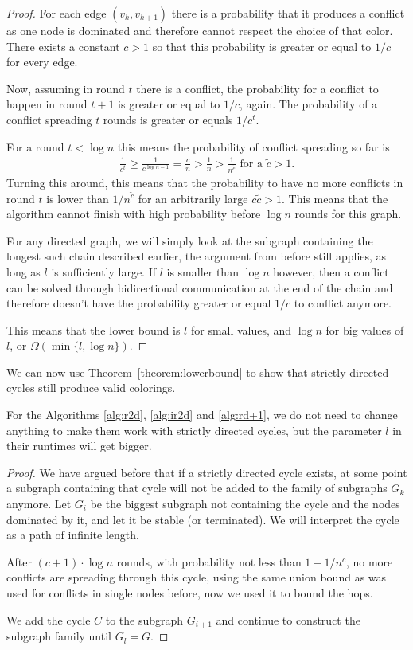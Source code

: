 \begin{proof}
For each edge $(v_k, v_{k+1})$ there is a probability that it produces a conflict as one node is dominated and therefore cannot respect the choice of that color. There exists a constant $c>1$ so that this probability is greater or equal to $1/c$ for every edge.

Now, assuming in round $t$ there is a conflict, the probability for a conflict to happen in round $t+1$ is greater or equal to $1/c$, again. The probability of a conflict spreading $t$ rounds is greater or equals $1/c^t$.

For a round $t < \log n$ this means the probability of conflict spreading so far is 
\begin{align*}
\frac{1}{c^t} \geq \frac{1}{c^{\log n-1}} = \frac{c}{n} > \frac{1}{n} > \frac{1}{n^{\tilde{c}}} \text{ for a } \tilde{c} > 1.
\end{align*}
Turning this around, this means that the probability to have no more conflicts in round $t$ is lower than $1/n^{\tilde{c}}$ for an arbitrarily large $c\tilde{c} > 1$. This means that the algorithm cannot finish with high probability before $\log n$ rounds for this graph.

For any directed graph, we will simply look at the subgraph containing the longest such chain described earlier, the argument from before still applies, as long as $l$ is sufficiently large. If $l$ is smaller than $\log n$ however, then a conflict can be solved through bidirectional communication at the end of the chain and therefore doesn't have the probability greater or equal $1/c$ to conflict anymore.

This means that the lower bound is $l$ for small values, and $\log n$ for big values of $l$, or $\Omega (\min\{l, \log n\})$.
\end{proof}

We can now use Theorem~\ref{theorem:lowerbound} to show that strictly directed cycles still produce valid colorings.

\begin{lemma}
For the Algorithms \ref{alg:r2d}, \ref{alg:ir2d} and \ref{alg:rd+1}, we do not need to change anything to make them work with strictly directed cycles, but the parameter $l$ in their runtimes will get bigger.
\end{lemma}
\begin{proof}
We have argued before that if a strictly directed cycle exists, at some point a subgraph containing that cycle will not be added to the family of subgraphs $G_k$ anymore. Let $G_i$ be the biggest subgraph not containing the cycle and the nodes dominated by it, and let it be stable (or terminated). We will interpret the cycle as a path of infinite length.

After $(c+1) \cdot \log n$ rounds, with probability not less than $1 - 1/n^c$, no more conflicts are spreading through this cycle, using the same union bound as was used for conflicts in single nodes before, now we used it to bound the hops.

We add the cycle $C$ to the subgraph $G_{i+1}$ and continue to construct the subgraph family until $G_l = G$.
\end{proof}




